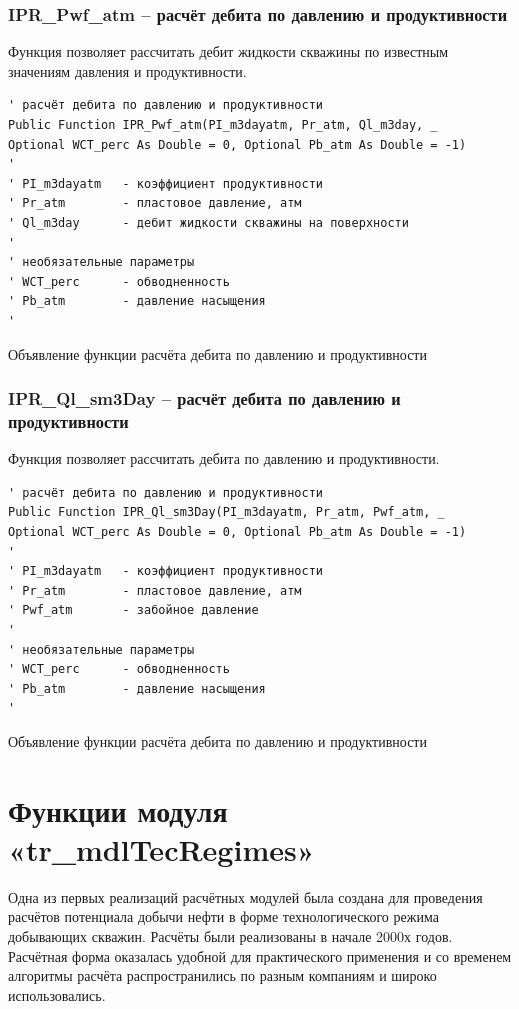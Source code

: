 \documentclass[]{scrreprt}
\begin{document}
\subsection{IPR\_Pwf\_atm – расчёт дебита по давлению и продуктивности}
Функция позволяет рассчитать дебит жидкости скважины по известным значениям давления и продуктивности.

\begin{listing}[H]
	\begin{verbatim}
' расчёт дебита по давлению и продуктивности
Public Function IPR_Pwf_atm(PI_m3dayatm, Pr_atm, Ql_m3day, _
Optional WCT_perc As Double = 0, Optional Pb_atm As Double = -1)
'
' PI_m3dayatm   - коэффициент продуктивности
' Pr_atm        - пластовое давление, атм
' Ql_m3day      - дебит жидкости скважины на поверхности
'
' необязательные параметры
' WCT_perc      - обводненность
' Pb_atm        - давление насыщения
'
	\end{verbatim}
	\caption{Объявление функции расчёта дебита по давлению и продуктивности}
	\label{lst:codedIPR_Pwf}
\end{listing}
\newpage
\subsection{IPR\_Ql\_sm3Day – расчёт дебита по давлению и продуктивности}
Функция позволяет рассчитать дебита по давлению и продуктивности.
\begin{listing}[H]
	\begin{verbatim}
' расчёт дебита по давлению и продуктивности
Public Function IPR_Ql_sm3Day(PI_m3dayatm, Pr_atm, Pwf_atm, _
Optional WCT_perc As Double = 0, Optional Pb_atm As Double = -1)
'
' PI_m3dayatm   - коэффициент продуктивности
' Pr_atm        - пластовое давление, атм
' Pwf_atm       - забойное давление
'
' необязательные параметры
' WCT_perc      - обводненность
' Pb_atm        - давление насыщения
'

	\end{verbatim}
	\caption{Объявление функции расчёта дебита по давлению и продуктивности}
	\label{lst:codedIPR_Ql}
\end{listing}

\newpage
\chapter{Функции модуля  «tr\_mdlTecRegimes»}
Одна из первых реализаций расчётных модулей \unf была создана для проведения расчётов потенциала добычи нефти в форме технологического режима добывающих скважин. Расчёты были реализованы в начале 2000х годов. Расчётная форма оказалась удобной для практического применения и со временем алгоритмы расчёта распространились по разным компаниям и широко использовались.
\end{document}
